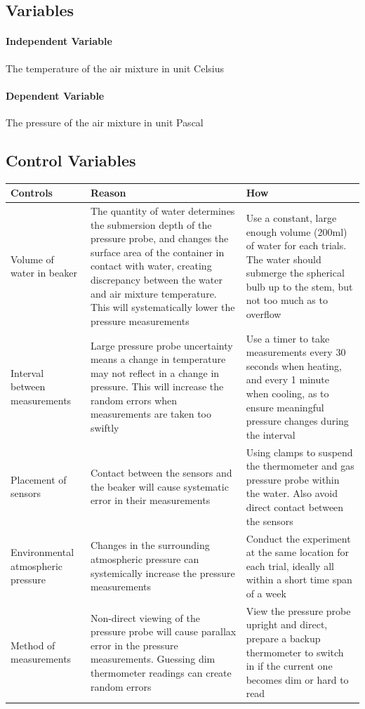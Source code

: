 \documentclass[a4paper,12pt]{article}
\begin{document}
\subsection{Variables}
\paragraph{Independent Variable}
The temperature of the air mixture in unit Celsius

\paragraph{Dependent Variable}
The pressure of the air mixture in unit Pascal

\subsection{Control Variables}

\begin{longtable}{P{0.2\textwidth}|P{0.35\textwidth}|P{0.35\textwidth}}
Controls & Reason & How\\\hline

Volume of water in beaker & The quantity of water determines the submersion depth of the pressure probe, and changes the surface area of the container in contact with water, creating discrepancy between the water and air mixture temperature. This will systematically lower the pressure measurements & Use a constant, large enough volume (200ml) of water for each trials. The water should submerge the spherical bulb up to the stem, but not too much as to overflow \\

Interval between measurements & Large pressure probe uncertainty means a change in temperature may not reflect in a change in pressure. This will increase the random errors when measurements are taken too swiftly & Use a timer to take measurements every 30 seconds when heating, and every 1 minute when cooling, as to ensure meaningful pressure changes during the interval \\

Placement of sensors & Contact between the sensors and the beaker will cause systematic error in their measurements & Using clamps to suspend the thermometer and gas pressure probe within the water. Also avoid direct contact between the sensors \\

Environmental atmospheric pressure & Changes in the surrounding atmospheric pressure can systemically increase the pressure measurements & Conduct the experiment at the same location for each trial, ideally all within a short time span of a week
\\

Method of measurements & Non-direct viewing of the pressure probe will cause parallax error in the pressure measurements. Guessing dim thermometer readings can create random errors & View the pressure probe upright and direct, prepare a backup thermometer to switch in if the current one becomes dim or hard to read \\
\end{longtable}
\end{document}
